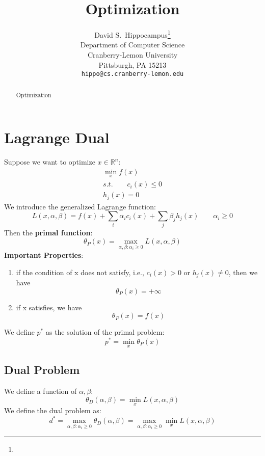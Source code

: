 \documentclass{article}
\title{Optimization}
\author{%
  David S.~Hippocampus\thanks{}\\%
  Department of Computer Science\\
  Cranberry-Lemon University\\
  Pittsburgh, PA 15213 \\
  \texttt{hippo@cs.cranberry-lemon.edu} \\
}
\begin{document}

\maketitle

\begin{abstract}
Optimization
\end{abstract}

\section{Lagrange Dual}
Suppose we want to optimize $x\in \mathbb{R}^n$:
\begin{eqnarray*}
\min_x f(x)\\
s.t.\qquad c_i(x) \le 0\\
h_j(x) = 0
\end{eqnarray*}
We introduce the generalized Lagrange function:
\begin{equation}
L(x,\alpha,\beta)=f(x)+\sum_i\alpha_ic_i(x)+\sum_j\beta_jh_j(x) \qquad \alpha_i \ge 0
\end{equation}
Then the \textbf{primal function}:
\begin{equation}
\theta_P(x) = \max_{\alpha,\beta:\alpha_i\ge0}L(x,\alpha,\beta)
\end{equation}
\textbf{Important Properties}: 
\begin{enumerate}
\item if the condition of x does not satisfy, i.e., $c_i(x)>0$ or $h_j(x)\neq0$, then we have
\begin{equation*}
\theta_P(x)=+\infty
\end{equation*}
\item if x satisfies, we have
\begin{equation*}
\theta_P(x)=f(x)
\end{equation*}
\end{enumerate}
We define $p^*$ as the solution of the primal problem:
\begin{equation}
p^*=\min_x\theta_P(x)
\end{equation}

\subsection{Dual Problem}
We define a function of $\alpha, \beta$:
\begin{equation}
\theta_D(\alpha, \beta)=\min_xL(x,\alpha,\beta)
\end{equation}
We define the dual problem as:
\begin{equation}
d^*=\max_{\alpha,\beta:\alpha_i\ge0}\theta_D(\alpha,\beta)=\max_{\alpha,\beta:\alpha_i\ge0}\min_xL(x,\alpha,\beta)
\end{equation}
\end{document}
